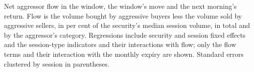\begin{table}[htbp]
\centering
\small
\caption{Net aggressor flow in the window, the window's move and the next morning's return.
Flow is the volume bought by aggressive buyers less the volume sold by aggressive sellers, in
per cent of the security's median session volume, in total and by the aggressor's category.
Regressions include security and session fixed effects and the session-type indicators and
their interactions with flow; only the flow terms and their interaction with the monthly
expiry are shown. Standard errors clustered by session in parentheses.}
\label{tab:flow}
\resizebox{\textwidth}{!}{}
\end{table}
